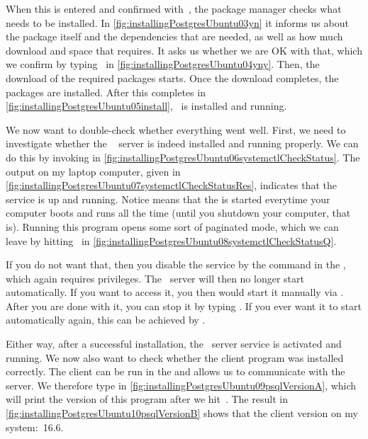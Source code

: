 When this is entered and confirmed with~\keys{\enter}, the package manager checks what needs to be installed.
In \cref{fig:installingPostgresUbuntu03yn} it informs us about the package itself and the dependencies that are needed, as well as how much download and space that requires.
It asks us whether we are OK with that, which we confirm by typing~ in \cref{fig:installingPostgresUbuntu04yny}.
Then, the download of the required packages starts.
Once the download completes, the packages are installed.
After this completes in \cref{fig:installingPostgresUbuntu05install}, \postgresql\ is installed and running.

We now want to double-check whether everything went well.
First, we need to investigate whether the \postgresql\  server is indeed installed and running properly.
We can do this by invoking  in \cref{fig:installingPostgresUbuntu06systemctlCheckStatus}.
The output on my laptop computer, given in \cref{fig:installingPostgresUbuntu07systemctlCheckStatusRes}, indicates that the service is up and running.
Notice  means that the  is started everytime your computer boots and runs all the time (until you shutdown your computer, that is).
Running this program opens some sort of paginated mode, which we can leave by hitting~ in \cref{fig:installingPostgresUbuntu08systemctlCheckStatusQ}.%
%
\begin{sloppypar}%
If you do not want that, then you disable the service by the command  in the , which again requires  privileges.
The \postgresql\ server will then no longer start automatically.
If you want to access it, you then would start it manually via .
After you are done with it, you can stop it by typing .
If you ever want it to start automatically again, this can be achieved by .%
\end{sloppypar}%
%
Either way, after a successful installation, the \postgresql\ server service is activated and running.
We now also want to check whether the client program  was installed correctly.
The client can be run in the  and allows us to communicate with the  server.
We therefore type  in \cref{fig:installingPostgresUbuntu09psqlVersionA}, which will print the version of this program after we hit~\keys{\enter}.
The result in \cref{fig:installingPostgresUbuntu10psqlVersionB} shows that the  client version on my system:~16.6.


